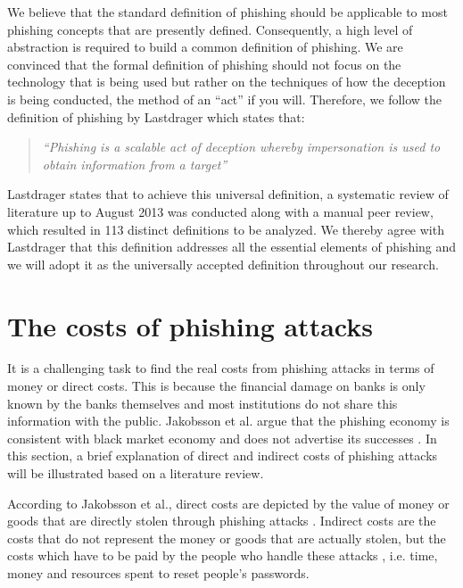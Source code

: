We believe that the standard definition of phishing should be applicable
to most phishing concepts that are presently defined. Consequently,
a high level of abstraction is required to build a common definition
of phishing. We are convinced that the formal definition of phishing
should not focus on the technology that is being used but rather on
the techniques of how the deception is being conducted, the method
of an \textquotedblleft act\textquotedblright{} if you will. Therefore,
we follow the definition of phishing by Lastdrager \citep{lastdrager:2014}
which states that:
\begin{quote}
\textit{``Phishing is a scalable act of deception whereby impersonation
is used to obtain information from a target''}
\end{quote}
Lastdrager \citep{lastdrager:2014} states that to achieve this universal
definition, a systematic review of literature up to August 2013 was
conducted along with a manual peer review, which resulted in 113 distinct
definitions to be analyzed. We thereby agree with Lastdrager \citep{lastdrager:2014}
that this definition addresses all the essential elements of phishing
and we will adopt it as the universally accepted definition throughout
our research.


\section{\label{sec:cost-of-phishing}The costs of phishing attacks}

It is a challenging task to find the real costs from phishing attacks
in terms of money or direct costs. This is because the financial damage
on banks is only known by the banks themselves and most institutions
do not share this information with the public. Jakobsson et al. argue
that the phishing economy is consistent with black market economy
and does not advertise its successes \citep{jakobsson:2006}. In this
section, a brief explanation of direct and indirect costs of phishing
attacks will be illustrated based on a literature review.

According to Jakobsson et al., direct costs are depicted by the value
of money or goods that are directly stolen through phishing attacks
\citep{jakobsson:2006}. Indirect costs are the costs that do not
represent the money or goods that are actually stolen, but the costs
which have to be paid by the people who handle these attacks \citep{jakobsson:2006},
i.e. time, money and resources spent to reset people's passwords.

